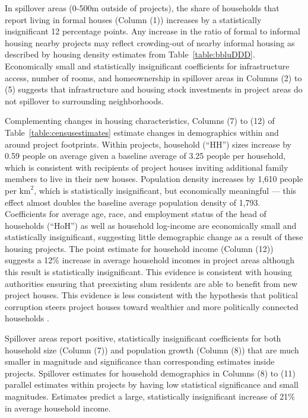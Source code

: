 \documentclass[12pt]{article}
\begin{document}
In spillover areas (0-500m outside of projects), the share of households that report living in formal houses (Column (1)) increases by a statistically insignificant 12 percentage points.  Any increase in the ratio of formal to informal housing nearby projects may reflect crowding-out of nearby informal housing as described by housing density estimates from Table~\ref{table:bbluDDD}.  Economically small and statistically insignificant coefficients for infrastructure access, number of rooms, and homeownership in spillover areas in Columns (2) to (5) suggests that infrastructure and housing stock investments in project areas do not spillover to surrounding neighborhoods.

Complementing changes in housing characteristics, Columns (7) to (12) of Table~\ref{table:censusestimates} estimate changes in demographics within and around project footprints.  Within projects, household (``HH'') sizes increase by 0.59 people on average given a baseline average of 3.25 people per household, which is consistent with recipients of project houses inviting additional family members to live in their new houses.  Population density increases by 1,610 people per $\text{km}^{2}$, which is statistically insignificant, but economically meaningful --- this effect almost doubles the baseline average population density of 1,793.  Coefficients for average age, race, and employment status of the head of households (``HoH'') as well as household log-income are economically small and statistically insignificant, suggesting little demographic change as a result of these housing projects.  The point estimate for household income (Column (12)) suggests a 12\% increase in average household incomes in project areas although this result is statistically insignificant.  This evidence is consistent with housing authorities ensuring that preexisting slum residents are able to benefit from new project houses.  This evidence is less consistent with the hypothesis that political corruption steers project houses toward wealthier and more politically connected households \citep{seriq}.

Spillover areas report positive, statistically insignificant coefficients for both household size (Column (7)) and population growth (Column (8)) that are much smaller in magnitude and significance than corresponding estimates inside projects.  Spillover estimates for household demographics in Columns (8) to (11) parallel estimates within projects by having low statistical significance and small magnitudes.  Estimates predict a large, statistically insignificant increase of 21\% in average household income.
\end{document}
